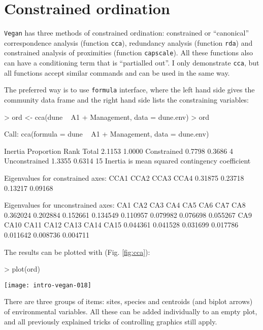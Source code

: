 \documentclass[a4paper,10pt]{amsart}
\begin{document}
\section{Constrained ordination}

\texttt{Vegan} has three methods of constrained ordination:
constrained or ``canonical'' correspondence analysis (function
\texttt{cca}), redundancy analysis (function \texttt{rda}) and
constrained analysis of proximities (function \texttt{capscale}).  All
these functions also can have a conditioning term that is ``partialled
out''.  I only demonstrate \texttt{cca}, but all functions accept
similar commands and can be used in the same way.

The preferred way is to use \texttt{formula} interface, where the left
hand side gives the community data frame and the right hand side lists
the constraining variables:
\begin{Schunk}
\begin{Sinput}
> ord <- cca(dune ~ A1 + Management, data = dune.env)
> ord
\end{Sinput}
\begin{Soutput}
Call: cca(formula = dune ~ A1 + Management, data = dune.env)

              Inertia Proportion Rank
Total          2.1153     1.0000     
Constrained    0.7798     0.3686    4
Unconstrained  1.3355     0.6314   15
Inertia is mean squared contingency coefficient 

Eigenvalues for constrained axes:
   CCA1    CCA2    CCA3    CCA4 
0.31875 0.23718 0.13217 0.09168 

Eigenvalues for unconstrained axes:
     CA1      CA2      CA3      CA4      CA5      CA6      CA7      CA8 
0.362024 0.202884 0.152661 0.134549 0.110957 0.079982 0.076698 0.055267 
     CA9     CA10     CA11     CA12     CA13     CA14     CA15 
0.044361 0.041528 0.031699 0.017786 0.011642 0.008736 0.004711 
\end{Soutput}
\end{Schunk}
The results can be plotted with (Fig. \ref{fig:cca}):
\begin{Schunk}
\begin{Sinput}
> plot(ord)
\end{Sinput}
\end{Schunk}
\begin{SCfigure}
\texttt{[image: intro-vegan-018]}
\caption{Default plot from constrained correspondence analysis.}
\label{fig:cca}
\end{SCfigure}
There are three groups of items: sites, species and centroids (and
biplot arrows) of environmental variables.  All these can be added
individually to an empty plot, and all previously explained tricks of
controlling graphics still apply.
\end{document}
